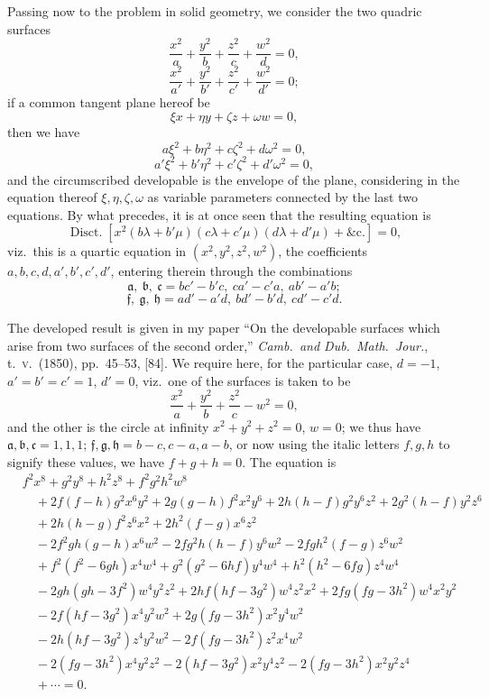 \documentclass[11pt,a4paper]{article}
\providecommand{\Disct}{\operatorname{Disct.}}
\begin{document}
Passing now to the problem in solid geometry, we consider the two quadric surfaces
\[
\frac{x^2}{a} + \frac{y^2}{b} + \frac{z^2}{c} + \frac{w^2}{d} = 0,
\]
\[
\frac{x^2}{a'} + \frac{y^2}{b'} + \frac{z^2}{c'} + \frac{w^2}{d'} = 0;
\]
if a common tangent plane hereof be
\[
\xi x + \eta y + \zeta z + \omega w = 0,
\]
then we have
\[
a \xi^2 + b \eta^2 + c \zeta^2 + d \omega^2 = 0,
\]
\[
a' \xi^2 + b' \eta^2 + c' \zeta^2 + d' \omega^2 = 0,
\]
and the circumscribed developable is the envelope of the plane, considering in the equation thereof $\xi, \eta, \zeta, \omega$ as variable parameters connected by the last two equations. By what precedes, it is at once seen that the resulting equation is
\[
\Disct \left[x^2 (b \lambda + b' \mu)(c \lambda + c' \mu)(d \lambda + d' \mu) + \&\text{c}.\right] = 0,
\]
viz.\ this is a quartic equation in $(x^2, y^2, z^2, w^2)$, the coefficients $a, b, c, d, a', b', c', d'$, entering therein through the combinations
\[
\mathfrak{a},\ \mathfrak{b},\ \mathfrak{c} = bc' - b'c,\ ca' - c'a,\ ab' - a'b;
\]
\[
\mathfrak{f},\ \mathfrak{g},\ \mathfrak{h} = ad' - a'd,\ bd' - b'd,\ cd' - c'd.
\]

The developed result is given in my paper ``On the developable surfaces which arise from two surfaces of the second order,'' \emph{Camb.\ and Dub.\ Math.\ Jour.}, t.\ \textsc{v}.\ (1850), pp.\ 45--53, [84]. We require here, for the particular case, $d = -1$, $a' = b' = c' = 1$, $d' = 0$, viz.\ one of the surfaces is taken to be
\[
\frac{x^2}{a} + \frac{y^2}{b} + \frac{z^2}{c} - w^2 = 0,
\]
and the other is the circle at infinity $x^2 + y^2 + z^2 = 0$, $w = 0$; we thus have $\mathfrak{a}, \mathfrak{b}, \mathfrak{c} = 1, 1, 1$; $\mathfrak{f}, \mathfrak{g}, \mathfrak{h} = b - c, c - a, a - b$, or now using the italic letters $f, g, h$ to signify these values, we have $f + g + h = 0$. The equation is
\begin{align*}
& f^2 x^8 + g^2 y^8 + h^2 z^8 + f^2 g^2 h^2 w^8 \\
& \quad + 2 f(f - h) g^2 x^6 y^2 + 2 g(g - h) f^2 x^2 y^6 + 2 h(h - f) g^2 y^6 z^2 + 2 g^2(h - f) y^2 z^6 \\
& \quad + 2 h(h - g) f^2 z^6 x^2 + 2 h^2(f - g) x^6 z^2 \\
& \quad - 2 f^2 g h (g - h) x^6 w^2 - 2 f g^2 h (h - f) y^6 w^2 - 2 f g h^2(f - g) z^6 w^2 \\
& \quad + f^2 (f^2 - 6 g h) x^4 w^4 + g^2 (g^2 - 6 h f) y^4 w^4 + h^2 (h^2 - 6 f g) z^4 w^4 \\
& \quad - 2 g h (g h - 3 f^2) w^4 y^2 z^2 + 2 h f (h f - 3 g^2) w^4 z^2 x^2 + 2 f g (f g - 3 h^2) w^4 x^2 y^2 \\
& \quad - 2 f (h f - 3 g^2) x^4 y^2 w^2 + 2 g (f g - 3 h^2) x^2 y^4 w^2 \\
& \quad - 2 h (h f - 3 g^2) z^4 y^2 w^2 - 2 f (f g - 3 h^2) z^2 x^4 w^2 \\
& \quad - 2 (f g - 3 h^2) x^4 y^2 z^2 - 2 (h f - 3 g^2) x^2 y^4 z^2 - 2 (f g - 3 h^2) x^2 y^2 z^4 \\
& \quad + \cdots = 0.
\end{align*}
\end{document}

